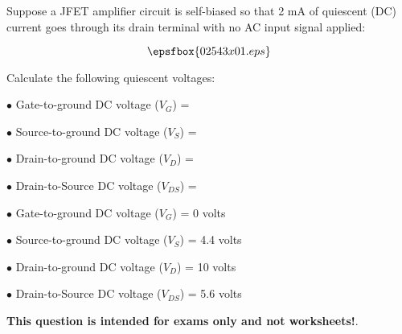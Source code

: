 

Suppose a JFET amplifier circuit is self-biased so that 2 mA of quiescent (DC) current goes through its drain terminal with no AC input signal applied:

$$\epsfbox{02543x01.eps}$$

Calculate the following quiescent voltages:

\medskip
\item{$\bullet$} Gate-to-ground DC voltage ($V_G$) = 
\item{$\bullet$} Source-to-ground DC voltage ($V_S$) =
\item{$\bullet$} Drain-to-ground DC voltage ($V_D$) =
\item{$\bullet$} Drain-to-Source DC voltage ($V_{DS}$) =
\medskip







\medskip
\item{$\bullet$} Gate-to-ground DC voltage ($V_G$) = 0 volts
\item{$\bullet$} Source-to-ground DC voltage ($V_S$) = 4.4 volts
\item{$\bullet$} Drain-to-ground DC voltage ($V_D$) = 10 volts
\item{$\bullet$} Drain-to-Source DC voltage ($V_{DS}$) = 5.6 volts
\medskip







{\bf This question is intended for exams only and not worksheets!}.




